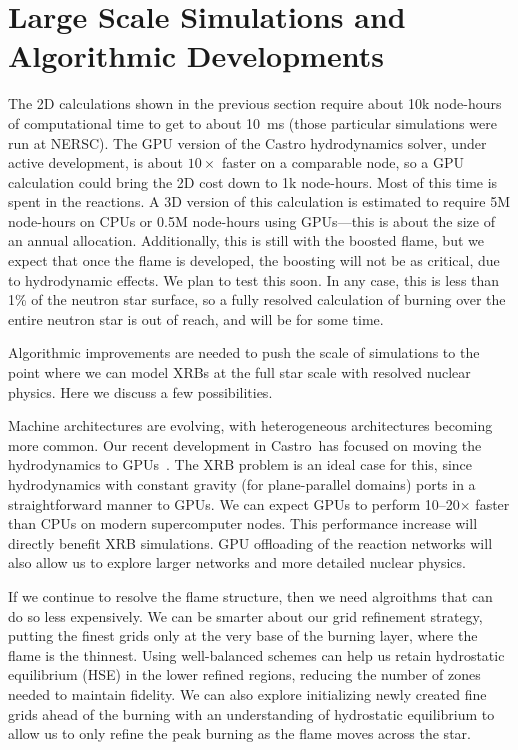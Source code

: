 \documentclass[a4paper]{jpconf}
\newcommand{\castro}{{\sffamily Castro}}
\newcommand{\MarginPar}[1]{\marginpar{\vskip-\baselineskip\raggedright\tiny\sffamily\hrule\smallskip{\color{red}#1}\par\smallskip\hrule}}
\begin{document}
\section{Large Scale Simulations and Algorithmic Developments}

The 2D calculations shown in the previous section require about 10k
node-hours of computational time to get to about 10~ms (those
particular simulations were run at NERSC).  The GPU version of the
Castro hydrodynamics solver, under active development, is about
$10\times$ faster on a comparable node, so a GPU calculation could
bring the 2D cost down to 1k node-hours.  Most of this time is spent
in the reactions\MarginPar{verify fraction}.  A 3D version of this
calculation is estimated to require 5M node-hours on CPUs or 0.5M
node-hours using GPUs---this is about the size of an
annual \MarginPar{double check \#s} allocation.  Additionally, this is
still with the boosted flame, but we expect that once the flame is
developed, the boosting will not be as critical, due to hydrodynamic
effects.  We plan to test this soon.  In any case, this is less than
1\% of the neutron star surface, so a fully resolved calculation of
burning over the entire neutron star is out of reach, and will be for
some time.

Algorithmic improvements are needed to push the scale of simulations
to the point where we can model XRBs at the full star scale with
resolved nuclear physics.  Here we discuss a few possibilities.

Machine architectures are evolving, with heterogeneous architectures
becoming more common.  Our recent development in \castro\ has focused
on moving the hydrodynamics to GPUs~\cite{astronum:2017}.  The XRB
problem is an ideal case for this, since hydrodynamics with constant
gravity (for plane-parallel domains) ports in a straightforward manner
to GPUs.  We can expect GPUs to perform 10--20$\times$ faster than
CPUs on modern supercomputer nodes.  This performance increase will
directly benefit XRB simulations.  GPU offloading of the reaction networks
will also allow us to explore larger networks and more detailed nuclear
physics.

If we continue to resolve the flame structure, then we need algroithms
that can do so less expensively.  We can be smarter about our grid
refinement strategy, putting the finest grids only at the very base of
the burning layer, where the flame is the thinnest.  Using
well-balanced schemes can help us retain hydrostatic equilibrium (HSE)
in the lower refined regions, reducing the number of zones needed to
maintain fidelity.  We can also explore initializing newly created fine
grids ahead of the burning with an understanding of hydrostatic
equilibrium to allow us to only refine the peak burning as the flame
moves across the star.
\end{document}
